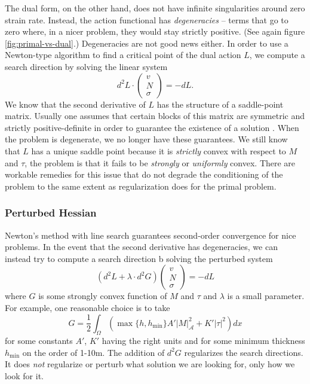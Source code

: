 \documentclass[review,oneside]{igs}
\begin{document}
The dual form, on the other hand, does not have infinite singularities around zero strain rate.
Instead, the action functional has \emph{degeneracies} -- terms that go to zero where, in a nicer problem, they would stay strictly positive.
(See again figure \ref{fig:primal-vs-dual}.)
Degeneracies are not good news either.
In order to use a Newton-type algorithm to find a critical point of the dual action $L$, we compute a search direction by solving the linear system
\begin{equation}
    d^2L\cdot\left(\begin{matrix} v \\ N \\ \sigma\end{matrix}\right) = -dL.
\end{equation}
We know that the second derivative of $L$ has the structure of a saddle-point matrix.
Usually one assumes that certain blocks of this matrix are symmetric and strictly positive-definite in order to guarantee the existence of a solution \citep{boffi2013mixed}.
When the problem is degenerate, we no longer have these guarantees.
We still know that $L$ has a unique saddle point because it is \emph{strictly} convex with respect to $M$ and $\tau$, the problem is that it fails to be \emph{strongly} or \emph{uniformly} convex.
There are workable remedies for this issue that do not degrade the conditioning of the problem to the same extent as regularization does for the primal problem.

\subsubsection{Perturbed Hessian}

Newton's method with line search guarantees second-order convergence for nice problems.
In the event that the second derivative has degeneracies, we can instead try to compute a search direction b solving the perturbed system
\begin{equation}
    \left(d^2L + \lambda\cdot d^2G\right)\left(\begin{matrix} v \\ N \\ \sigma\end{matrix}\right) = -dL
    \label{eq:regularized-newton-step}
\end{equation}
where $G$ is some strongly convex function of $M$ and $\tau$ and $\lambda$ is a small parameter.
For example, one reasonable choice is to take
\begin{equation}
    G = \frac{1}{2}\int_\Omega\left(\max\{h, h_{\text{min}}\}A'|M|_{\mathscr{A}}^2 + K'|\tau|^2\right)dx
\end{equation}
for some constants $A'$, $K'$ having the right units and for some minimum thickness $h_{\text{min}}$ on the order of 1-10m.
The addition of $d^2G$ regularizes the search directions.
It does \emph{not} regularize or perturb what solution we are looking for, only how we look for it.
\end{document}
